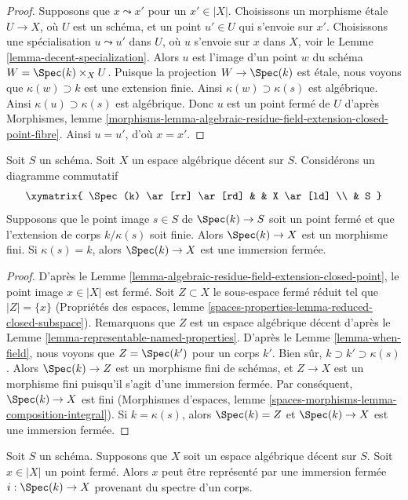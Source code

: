 \begin{proof}
Supposons que $x \leadsto x'$ pour un $x' \in |X|$. Choisissons un
morphisme étale $U \to X$, où $U$ est un schéma, et un point $u' \in U$
qui s'envoie sur $x'$. Choisissons une spécialisation $u \leadsto u'$ dans
$U$, où $u$ s'envoie sur $x$ dans $X$, voir le
Lemme \ref{lemma-decent-specialization}.
Alors $u$ est l'image d'un point $w$ du schéma
$W = \Spec(k) \times_X U$. Puisque la projection $W \to \Spec(k)$ est étale,
nous voyons que $\kappa(w) \supset k$ est une extension finie. Ainsi
$\kappa(w) \supset \kappa(s)$ est algébrique. Ainsi
$\kappa(u) \supset \kappa(s)$ est algébrique. Donc $u$ est un point fermé de
$U$ d'après Morphismes, lemme
\ref{morphisms-lemma-algebraic-residue-field-extension-closed-point-fibre}.
Ainsi $u = u'$, d'où $x = x'$.
\end{proof}

\begin{lemma}
\label{lemma-finite-residue-field-extension-finite}
Soit $S$ un schéma. Soit $X$ un espace algébrique décent sur $S$.
Considérons un diagramme commutatif
$$
\xymatrix{
\Spec(k) \ar[rr] \ar[rd] & & X \ar[ld] \\
& S
}
$$
Supposons que le point image $s \in S$ de $\Spec(k) \to S$ soit un point
fermé et que l'extension de corps $k/\kappa(s)$ soit finie.
Alors $\Spec(k) \to X$ est un morphisme fini. Si $\kappa(s) = k$,
alors $\Spec(k) \to X$ est une immersion fermée.
\end{lemma}

\begin{proof}
D'après le Lemme \ref{lemma-algebraic-residue-field-extension-closed-point},
le point image $x \in |X|$ est fermé. Soit $Z \subset X$ le sous-espace
fermé réduit tel que $|Z| = \{x\}$ (Propriétés des espaces,
lemme \ref{spaces-properties-lemma-reduced-closed-subspace}).
Remarquons que $Z$ est un espace algébrique décent d'après le
Lemme \ref{lemma-representable-named-properties}.
D'après le Lemme \ref{lemma-when-field}, nous voyons que
$Z = \Spec(k')$ pour un corps $k'$. Bien sûr,
$k \supset k' \supset \kappa(s)$. Alors $\Spec(k) \to Z$ est un morphisme
fini de schémas, et $Z \to X$ est un morphisme fini puisqu'il s'agit d'une
immersion fermée. Par conséquent, $\Spec(k) \to X$ est fini (Morphismes
d'espaces, lemme \ref{spaces-morphisms-lemma-composition-integral}).
Si $k = \kappa(s)$, alors $\Spec(k) = Z$ et $\Spec(k) \to X$ est une
immersion fermée.
\end{proof}

\begin{lemma}
\label{lemma-decent-space-closed-point}
Soit $S$ un schéma. Supposons que $X$ soit un espace algébrique décent sur
$S$. Soit $x \in |X|$ un point fermé. Alors $x$ peut être représenté par une
immersion fermée $i : \Spec(k) \to X$ provenant du spectre d'un corps.
\end{lemma}

